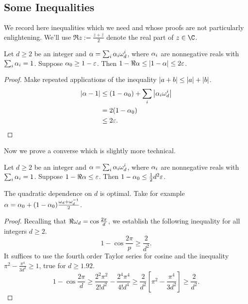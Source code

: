\begin{appendices}

\section{Some Inequalities}
We record here inequalities which we need and whose proofs are not particularly enlightening. We'll use $\Re z:= \frac{z + \bar z}2$ denote the real part of $z\in \C$.
\begin{lemma}
\label{lemma:convex-inequality-easy}
	Let $d\geq 2$ be an integer and $\alpha = \sum_i \alpha_i \omega_d^i$, where $\alpha_i$ are nonnegative reals with $\sum_i \alpha_i = 1$. Suppose $\alpha_0 \geq 1-\varepsilon$. Then $1 - \Re\alpha \leq \left\vert1-\alpha\right\vert \leq 2\varepsilon$.
\end{lemma}
\begin{proof}
	Make repeated applications of the inequality $\left\vert a+b\right\vert \leq \left\vert a\right\vert + \left\vert b\right\vert$. 
	\begin{align}
		\left\vert\alpha - 1\right\vert
		& \leq (1-\alpha_0) + \sum_i\left\vert\alpha_i\omega_d^i\right\vert
		\\& = 2(1-\alpha_0) 
		\\&\leq 2\varepsilon.
	\end{align}
\end{proof}
Now we prove a converse which is slightly more technical.
\begin{lemma}
\label{lemma:convex-inequality-hard}
	Let $d\geq 2$ be an integer and $\alpha = \sum_i \alpha_i \omega_d^i$, where $\alpha_i$ are nonnegative reals with $\sum_i \alpha_i = 1$. 
	Suppose $1- \Re\alpha \leq \varepsilon$. Then $1-\alpha_0 \leq \frac12d^2\varepsilon$.

\end{lemma}
The quadratic dependence on $d$ is optimal. Take for example $\alpha = \alpha_0 + (1-\alpha_0) \frac{\omega_d+\omega_d^{-1}}2$. 
\begin{proof}
Recalling that $\Re\omega_d = \cos\frac{2\pi}d$, we establish the following inequality for all integers $d\geq 2$.
\begin{equation}
	1 - \cos \frac{2\pi}p \geq \frac{2}{d^2}.
\end{equation}
It suffices to use the fourth order Taylor series for cosine and the inequality $\pi^2 - \frac{\pi^4}{3d^2} \geq 1$, true for $d\geq 1.92$.
\begin{equation}
	1 - \cos \frac{2\pi}d \geq \frac{2^2\pi^2}{2!d^2} - \frac{2^4\pi^4}{4!d^4} 
	\geq \frac{2}{d^2}\left[\pi^2 - \frac{\pi^4}{3d^2}\right]
	\geq \frac{2}{d^2}.
\end{equation}


\end{proof}
\end{appendices}
